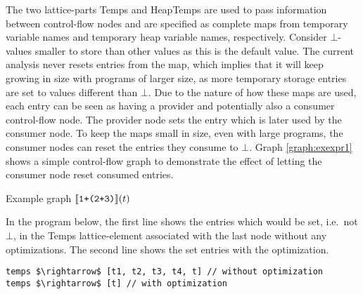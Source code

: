 The two lattice-parts Temps and HeapTemps are used to pass information between control-flow nodes and are specified as complete maps from temporary variable names and temporary heap variable names, respectively. Consider $\bot$-values smaller to store than other values as this is the default value. The current analysis never resets entries from the map, which implies that it will keep growing in size with programs of larger size, as more temporary storage entries are set to values different than $\bot$. Due to the nature of how these maps are used, each entry can be seen as having a provider and potentially also a consumer control-flow node. The provider node sets the entry which is later used by the consumer node. To keep the maps small in size, even with large programs, the consumer nodes can reset the entries they consume to $\bot$. Graph \ref{graph:exexpr1} shows a simple control-flow graph to demonstrate the effect of letting the consumer node reset consumed entries.
\begin{graph}
\centering
\begin{adjustbox}{max size={1\textwidth}{.25\textheight}, margin = 10pt}\end{adjustbox}

\caption{Example graph $\llbracket \texttt{1+(2+3)}\rrbracket(t)$}
\label{graph:exexpr1}
\end{graph}

In the program below, the first line shows the entries which would be set, i.e.\ not $\bot$, in the Temps lattice-element associated with the last node without any optimizations. The second line shows the set entries with the optimization.
\begin{lstlisting}[mathescape]
temps $\rightarrow$ [t1, t2, t3, t4, t] // without optimization
temps $\rightarrow$ [t] // with optimization
\end{lstlisting}

